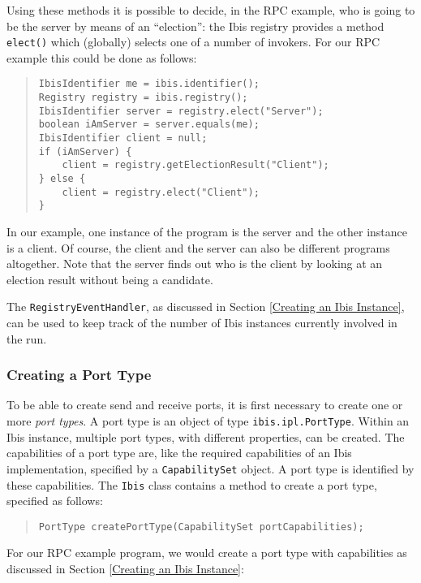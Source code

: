 \documentclass[10pt]{article}
\begin{document}
Using these methods it is possible to decide, in the RPC example,
who is going to be the server by means of an ``election'': the Ibis
registry provides a method \texttt{elect()} which (globally) selects
one of a number of invokers.  For our RPC example this could be done as
follows:

{\small
\begin{quote}
\begin{verbatim}
IbisIdentifier me = ibis.identifier();
Registry registry = ibis.registry();
IbisIdentifier server = registry.elect("Server");
boolean iAmServer = server.equals(me);
IbisIdentifier client = null;
if (iAmServer) {
    client = registry.getElectionResult("Client");
} else {
    client = registry.elect("Client");
}
\end{verbatim}
\end{quote}
}

In our example, one instance of the program is the server and the
other instance is a client.  Of course, the client and the server can also
be different programs altogether.
Note that the server finds out who is the client by looking at an election
result without being a candidate.

The \texttt{RegistryEventHandler}, as discussed in Section
\ref{Creating an Ibis Instance}, can be used to keep track of the number
of Ibis instances currently involved in the run.

\subsubsection{Creating a Port Type}

To be able to create send and receive ports, it is first necessary
to create one or more \emph{port types}.
A port type is an object
of type \texttt{ibis.ipl.PortType}.
Within an Ibis instance,
multiple port types, with different properties, can be created.
The capabilities of a port type are, like the required capabilities
of an Ibis implementation, specified by a \texttt{CapabilitySet} object.
A port type is identified by these capabilities.
The \texttt{Ibis} class contains a method to create a port type,
specified as follows:
{\small
\begin{quote}
\begin{verbatim}
PortType createPortType(CapabilitySet portCapabilities);
\end{verbatim}
\end{quote}
}

\noindent
For our RPC example program, we would create a port type with capabilities
as discussed in Section \ref{Creating an Ibis Instance}:
\end{document}
